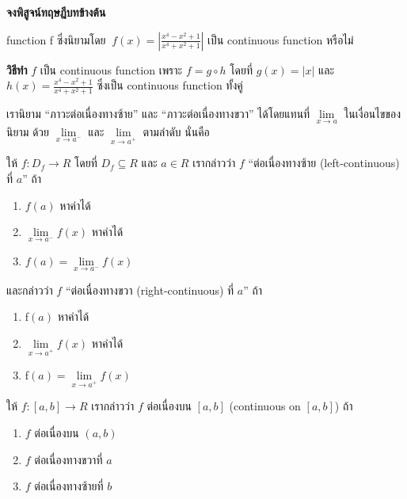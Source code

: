 \documentclass[
]{book}
\begin{document}
\textbf{จงพิสูจน์ทฤษฎีบทข้างต้น}

\label{ex-cont-3}
function f ซึ่งนิยามโดย
\(\ f\left( x\right) =\left| \frac{x^{4}-x^{2}+1}{x^{4}+x^{2}+1}\right|\)
เป็น continuous function หรือไม่

\textbf{วิธีทำ} \(f\) เป็น continuous function เพราะ \(f =g\circ h\) โดยที่
\(g\left( x\right) =\left| x\right|\) และ
\(h\left( x\right) =\frac{x^{4}-x^{2}+1}{x^{4}+x^{2}+1}\) ซึ่งเป็น
continuous function ทั้งคู่

เรานิยาม ``ภาวะต่อเนื่องทางซ้าย'' และ ``ภาวะต่อเนื่องทางขวา'' ได้โดยแทนที่
\(\underset{x\rightarrow a}{\lim}\) ในเงื่อนไขของนิยาม ด้วย
\(\underset{x\rightarrow a^{-}}{\lim}\) และ
\(\underset{x\rightarrow a^{+}}{\lim}\) ตามลำดับ นั่นคือ

ให้ \(f:D_{f}\rightarrow R\) โดยที่ \(D_{f}\subseteq R\) และ \(a\in R\)
เรากล่าวว่า \(f\) ``ต่อเนื่องทางซ้าย (left-continuous) ที่ \(a\)'' ถ้า

\begin{enumerate}
\def\labelenumi{\arabic{enumi}.}
\item
  \(f\left( a\right)\) หาค่าได้
\item
  \(\underset{x\rightarrow a^{-}}{\lim}f(x)\) หาค่าได้
\item
  \(f\left( a\right) =\underset{x\rightarrow a^{-}}{\lim}f(x)\)
\end{enumerate}

และกล่าวว่า \(f\) ``ต่อเนื่องทางขวา (right-continuous) ที่ \(a\)'' ถ้า

\begin{enumerate}
\def\labelenumi{\arabic{enumi}.}
\item
  f\(\left( a\right)\) หาค่าได้
\item
  \(\underset{x\rightarrow a^{+}}{\lim}f(x)\) หาค่าได้
\item
  f\(\left( a\right) =\underset{x\rightarrow a^{+}}{\lim}f(x)\)
\end{enumerate}

ให้ \(f : \left[ a,b\right] \rightarrow R\) เรากล่าวว่า \(f\) ต่อเนื่องบน
\(\left[ a,b\right]\) (continuous on \(\left[ a,b\right]\)) ถ้า

\begin{enumerate}
\def\labelenumi{\arabic{enumi}.}
\item
  \(f\) ต่อเนื่องบน \((a,b)\)
\item
  \(f\) ต่อเนื่องทางขวาที่ \(a\)
\item
  \(f\) ต่อเนื่องทางซ้ายที่ \(b\)
\end{enumerate}
\end{document}
